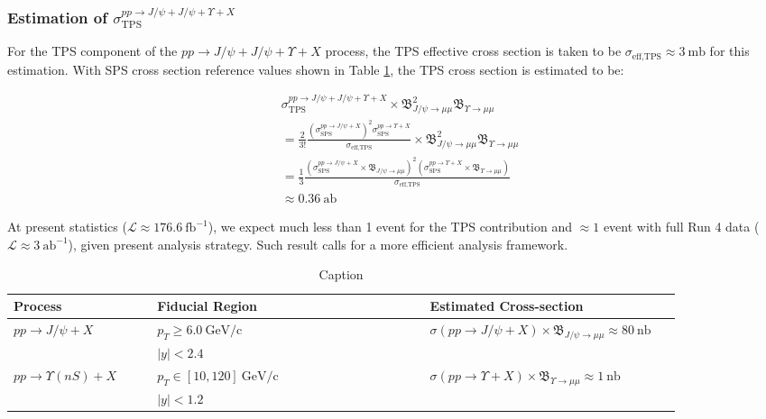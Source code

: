 \documentclass[10pt,twocolumn]{article}
\newcommand*{\effXsecTPS}{\sigma_{\text{eff,TPS}}}
\newcommand*{\GeVc}{~\text{GeV/c}}
\begin{document}
\subsubsection{Estimation of $\sigma_{\text{TPS}}^{pp\to J/\psi+J/\psi+\Upsilon+X}$}

For the TPS component of the $pp\to J/\psi+J/\psi+\Upsilon+X$ process, the TPS effective cross section is taken to be $\effXsecTPS \approx 3 ~\text{mb}$ for this estimation. With SPS cross section reference values shown in Table \ref{tab:sps_xsec}, the TPS cross section is estimated to be:

\begin{equation}
    \begin{aligned}
    & \sigma_{\text{TPS}}^{pp\to J/\psi+J/\psi+\Upsilon+X} \times \mathfrak{B}_{J/\psi\to\mu\mu}^2\mathfrak{B}_{\Upsilon\to\mu\mu} \\
    & = \frac{2}{3!} \frac{\left(\sigma^{pp\to J/\psi+X}_{\text{SPS}}\right)^2\sigma^{pp\to \Upsilon+X}_{\text{SPS}}}{\effXsecTPS}\times \mathfrak{B}_{J/\psi\to\mu\mu}^2\mathfrak{B}_{\Upsilon\to\mu\mu} \\
    & = \frac{1}{3} \frac{\left(\sigma^{pp\to J/\psi+X}_{\text{SPS}}\times \mathfrak{B}_{J/\psi\to\mu\mu}\right)^2\left(\sigma^{pp\to \Upsilon+X}_{\text{SPS}}\times\mathfrak{B}_{\Upsilon\to\mu\mu}\right)}{\effXsecTPS} \\
    & \approx 0.36 ~\text{ab}
    \end{aligned} 
\end{equation}

At present statistics ($\mathcal{L} \approx 176.6 ~\text{fb}^{-1}$), we expect much less than 1 event for the TPS contribution and $\approx 1$ event with full Run 4 data ($\mathcal{L} \approx 3 ~\text{ab}^{-1}$), given present analysis strategy. Such result calls for a more efficient analysis framework.

\begin{table}[h!]
    \centering
    \caption{Caption}
    \begin{tabular}{p{0.2\linewidth} p{0.38\linewidth} p{0.35\linewidth}}
    \toprule
        Process & Fiducial Region & Estimated Cross-section \\
    \midrule
        \multirow{2}{\linewidth}{$pp\to J/\psi+X$}&
        $p_T\geq 6.0 \GeVc$ &
        \multirow{2}{\linewidth}{$\sigma(pp\to J/\psi+X) \times \mathfrak{B}_{J/\psi\to\mu\mu} \approx 80 ~\text{nb}$} \\
        & $|y| < 2.4$& \\
        \multirow{2}{\linewidth}{$pp\to \Upsilon(nS) +X$}&
        $p_T\in [10,120] \GeVc$ &
        \multirow{2}{\linewidth}{$\sigma(pp\to \Upsilon+X) \times \mathfrak{B}_{\Upsilon\to\mu\mu} \approx 1~\text{nb}$} \\
        & $|y| < 1.2$& \\
    \bottomrule
    \end{tabular}
    \label{tab:sps_xsec}
\end{table}
\end{document}
